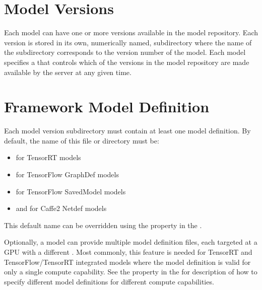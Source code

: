 \documentclass[letterpaper,10pt,english]{sphinxmanual}
\begin{document}
\section{Model Versions}
\label{\detokenize{model_repository:model-versions}}\label{\detokenize{model_repository:section-model-versions}}
Each model can have one or more versions available in the model
repository. Each version is stored in its own, numerically named,
subdirectory where the name of the subdirectory corresponds to the
version number of the model. Each model specifies a {\hyperref[\detokenize{model_configuration:section-version-policy}]{}} that controls which of the versions
in the model repository are made available by the server at any given
time.


\section{Framework Model Definition}
\label{\detokenize{model_repository:framework-model-definition}}\label{\detokenize{model_repository:section-framework-model-definition}}
Each model version subdirectory must contain at least one model
definition. By default, the name of this file or directory must be:
\begin{itemize}
\item {} 
 for TensorRT models

\item {} 
 for TensorFlow GraphDef models

\item {} 
 for TensorFlow SavedModel models

\item {} 
 and  for Caffe2 Netdef models

\end{itemize}

This default name can be overridden using the 
property in the {\hyperref[\detokenize{model_configuration:section-model-configuration}]{}}.

Optionally, a model can provide multiple model definition files, each
targeted at a GPU with a different . Most commonly, this
feature is needed for TensorRT and TensorFlow/TensorRT integrated
models where the model definition is valid for only a single compute
capability. See the  property in the {\hyperref[\detokenize{model_configuration:section-model-configuration}]{}} for description of how to
specify different model definitions for different compute
capabilities.
\end{document}
